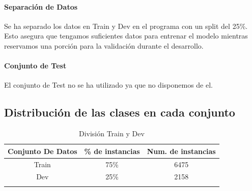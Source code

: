 \documentclass{report}
\begin{document}
                \paragraph*{Separación de Datos}{
                    Se ha separado los datos en Train y Dev en el programa con un split del 25\%. Esto asegura que tengamos suficientes datos para entrenar el modelo mientras reservamos una porción para la validación durante el desarrollo.
                }
                \paragraph*{Conjunto de Test}{
                    El conjunto de Test no se ha utilizado ya que no disponemos de el.
                }
            \subsection{Distribución de las clases en cada conjunto}
                \begin{longtable}{|c|c|c|}
                    \hline
                    \textbf{Conjunto De Datos} & \textbf{\% de instancias}& \textbf{Num. de instancias}  \\ \hline
                    Train & {75\%} & {6475}\\ 
                    \hline
                    Dev & {25\%} & {2158}\\ 
                    \hline
                    \caption{División Train y Dev}
                \end{longtable}
\end{document}
